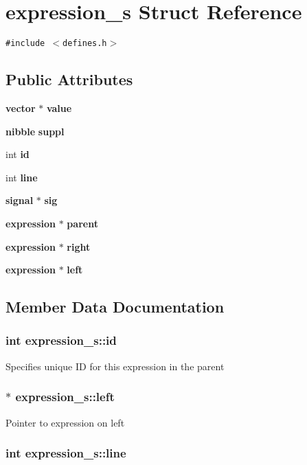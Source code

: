 \section{expression\_\-s  Struct Reference}
\label{structexpression__s}
{\tt \#include $<$defines.h$>$}

\subsection*{Public Attributes}
\begin{CompactItemize}
\item 
{\bf vector} $\ast$ {\bf value}
\item 
{\bf nibble} {\bf suppl}
\item 
int {\bf id}
\item 
int {\bf line}
\item 
{\bf signal} $\ast$ {\bf sig}
\item 
{\bf expression} $\ast$ {\bf parent}
\item 
{\bf expression} $\ast$ {\bf right}
\item 
{\bf expression} $\ast$ {\bf left}
\end{CompactItemize}


\subsection{Member Data Documentation}
\subsubsection{\setlength{\rightskip}{0pt plus 5cm}int expression\_\-s::id}\label{structexpression__s_m2}


Specifies unique ID for this expression in the parent 
\subsubsection{$\ast$ expression\_\-s::left}\label{structexpression__s_m7}


Pointer to expression on left 
\subsubsection{\setlength{\rightskip}{0pt plus 5cm}int expression\_\-s::line}\label{structexpression__s_m3}


